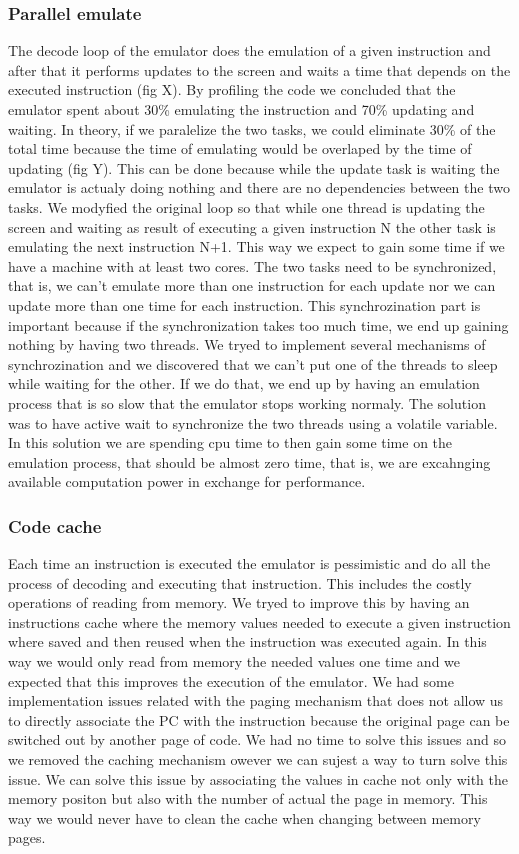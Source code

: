 \subsubsection{Parallel emulate}
The decode loop of the emulator does the emulation of a given instruction and after that it performs updates to the screen and waits a time that depends on the executed instruction (fig X). By profiling the code we concluded that the emulator spent about 30\% emulating the instruction and 70\% updating and waiting.
In theory, if we paralelize the two tasks, we could eliminate 30\% of the total time because the time of emulating would be overlaped by the time of updating (fig Y). This can be done because while the update task is waiting the emulator is actualy doing nothing and there are no dependencies between the two tasks.
We modyfied the original loop so that while one thread is updating the screen and waiting as result of executing a given instruction N the other task is emulating the next instruction N+1. This way we expect to gain some time if we have a machine with at least two cores.
The two tasks need to be synchronized, that is, we can’t emulate more than one instruction for each update nor we can update more than one time for each instruction. This synchrozination part is important because if the synchronization takes too much time, we end up gaining nothing by having two threads. We tryed to implement several mechanisms of synchrozination and we discovered that we can’t put one of the threads to sleep while waiting for the other. If we do that, we end up by having an emulation process that is so slow that the emulator stops working normaly. The solution was to have active wait to synchronize the two threads using a volatile variable. In this solution we are spending cpu time to then gain some time on the emulation process, that should be almost zero time, that is, we are excahnging available computation power in exchange for performance.

\subsubsection{Code cache}
Each time an instruction is executed the emulator is pessimistic and do all the process of decoding and executing that instruction. This includes the costly operations of reading from memory. We tryed to improve this by having an instructions cache where the memory values needed to execute a given instruction where saved and then reused when the instruction was executed again. In this way we would only read from memory the needed values one time and we expected that this improves the execution of the emulator. We had some implementation issues related with the paging mechanism that does not allow us to directly associate the PC with the instruction because the original page can be switched out by another page of code. We had no time to solve this issues and so we removed the caching mechanism owever we can sujest a way to turn solve this issue.
We can solve this issue by associating the values in cache not only with the memory positon but also with the number of actual the page in memory. This way we would never have to clean the cache when changing between memory pages.